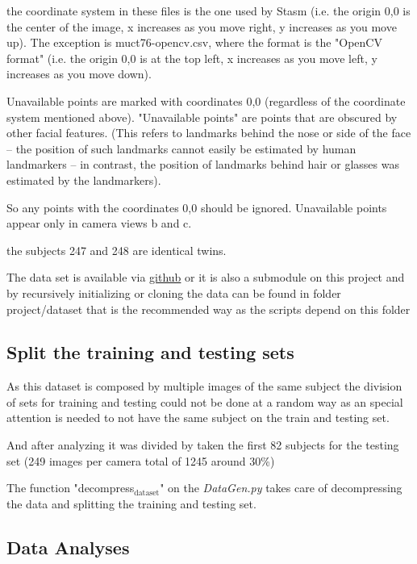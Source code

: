 \documentclass[11pt]{article}
\begin{document}
the coordinate system in these files is the one used by Stasm (i.e. the
origin 0,0 is the center of the image, x increases as you move right, y
increases as you move up).  The exception is muct76-opencv.csv, where the
format is the "OpenCV format" (i.e. the origin 0,0 is at the top left, x
increases as you move left, y increases as you move down). 

Unavailable points are marked with coordinates 0,0 (regardless of the
coordinate system mentioned above).  "Unavailable points" are points
that are obscured by other facial features.  (This refers to landmarks
behind the nose or side of the face -- the position of such landmarks
cannot easily be estimated by human landmarkers -- in contrast, the
position of landmarks behind hair or glasses was estimated by the
landmarkers).  

So any points with the coordinates 0,0 should be ignored.  Unavailable
points appear only in camera views b and c.  

the subjects 247 and 248 are identical twins.

The data set is available via \href{https://github.com/StephenMilborrow/muct}{github} or it is also a submodule on this
project and by recursively initializing or cloning the data can be found in 
folder project/dataset that is the recommended way as the scripts depend on
this folder 


\subsection{Split the training and testing sets}
\label{sec:org5af3151}

As this dataset is composed by multiple images of the same subject the
division of sets for training and testing could not be done at a random way
as an special attention is needed to not have the same subject on the train
and testing set.

And after analyzing it was divided by taken the first 82 subjects for the
testing set (249 images per camera total of 1245 around 30\%)

The function "decompress\(_{\text{dataset}}\)" on the \emph{DataGen.py} takes care of
decompressing the data and splitting the training and testing set. 

\subsection{Data Analyses}
\label{sec:org1cfc347}
\end{document}
